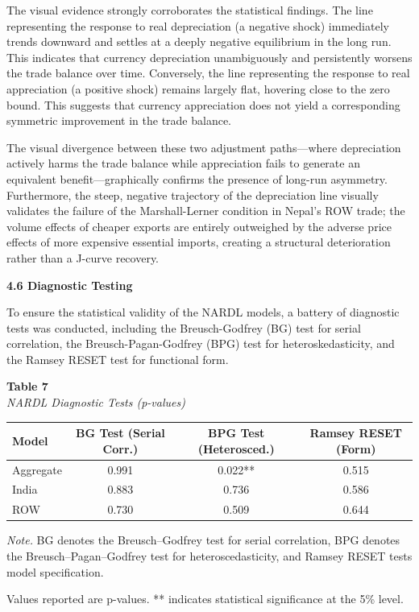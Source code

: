 \documentclass[12pt]{article}
\begin{document}
The visual evidence strongly corroborates the statistical findings. The line representing the response to real depreciation (a negative shock) immediately trends downward and settles at a deeply negative equilibrium in the long run. This indicates that currency depreciation unambiguously and persistently worsens the trade balance over time. Conversely, the line representing the response to real appreciation (a positive shock) remains largely flat, hovering close to the zero bound. This suggests that currency appreciation does not yield a corresponding symmetric improvement in the trade balance.

The visual divergence between these two adjustment paths—where depreciation actively harms the trade balance while appreciation fails to generate an equivalent benefit—graphically confirms the presence of long-run asymmetry. Furthermore, the steep, negative trajectory of the depreciation line visually validates the failure of the Marshall-Lerner condition in Nepal's ROW trade; the volume effects of cheaper exports are entirely outweighed by the adverse price effects of more expensive essential imports, creating a structural deterioration rather than a J-curve recovery.

\vspace{0.5cm}
\noindent\textbf{4.6 Diagnostic Testing}

To ensure the statistical validity of the NARDL models, a battery of diagnostic tests was conducted, including the Breusch-Godfrey (BG) test for serial correlation, the Breusch-Pagan-Godfrey (BPG) test for heteroskedasticity, and the Ramsey RESET test for functional form.

\begin{table}[htbp]
\raggedright

\textbf{Table 7}\\
\textit{NARDL Diagnostic Tests (p-values)}

\vspace{0.3cm}

\renewcommand{\arraystretch}{1.4}
\setlength{\tabcolsep}{14pt}

\begin{tabular}{lccc}
\hline
Model & BG Test (Serial Corr.) & BPG Test (Heterosced.) & Ramsey RESET (Form) \\
\hline
Aggregate & 0.991 & 0.022** & 0.515 \\
India & 0.883 & 0.736 & 0.586 \\
ROW & 0.730 & 0.509 & 0.644 \\
\hline
\end{tabular}

\vspace{0.3cm}

\footnotesize
\textit{Note.} BG denotes the Breusch--Godfrey test for serial correlation, BPG denotes the Breusch--Pagan--Godfrey test for heteroscedasticity, and Ramsey RESET tests model specification. 

Values reported are p-values. ** indicates statistical significance at the 5\% level.

\end{table}
\end{document}
